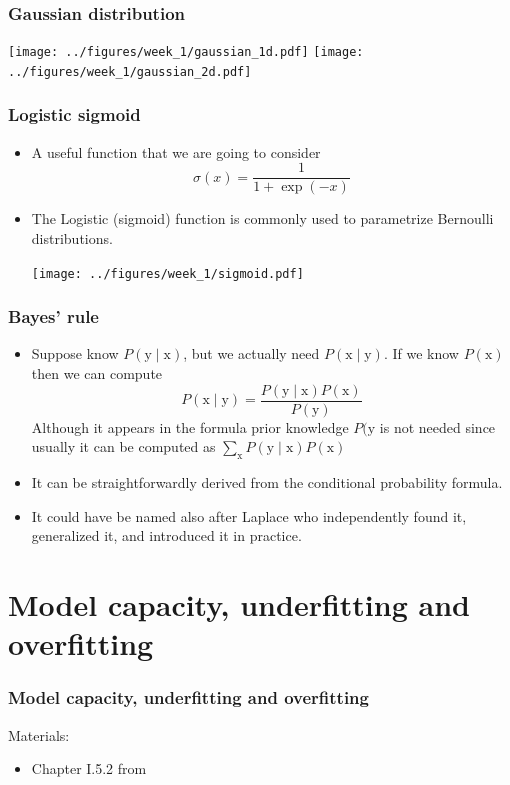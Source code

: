 \documentclass[notes]{beamer}          %
\begin{document}
\begin{frame}
\frametitle{Gaussian distribution}
\begin{center}
\texttt{[image: ../figures/week\_1/gaussian\_1d.pdf]}
\hfill
\texttt{[image: ../figures/week\_1/gaussian\_2d.pdf]}
\end{center}
\end{frame}

\begin{frame}
\frametitle{Logistic sigmoid}
\begin{itemize}
    \item A useful function that we are going to consider
    $$\sigma(x) = \frac{1}{1 + \exp{(-x)}}$$
    \item The Logistic (sigmoid) function is commonly used to parametrize Bernoulli distributions.
    \begin{center}
    \texttt{[image: ../figures/week\_1/sigmoid.pdf]}
    \end{center}

\end{itemize}
\end{frame}


\begin{frame}
\frametitle{Bayes' rule}
\begin{itemize}
    \item Suppose know $P(\text{y} \mid \text{x})$, but we actually need $P(\text{x} \mid \text{y})$. If we know $P(\text{x})$ then we can compute
    $$
        P(\text{x} \mid \text{y}) = \frac{P(\text{y} \mid \text{x})P(\text{x})}{P(\text{y})}
    $$
    Although it appears in the formula prior knowledge $P(\text{y}$ is not needed since usually it can be computed as $\sum_{\text{x}} P(\text{y} \mid \text{x})P(\text{x})$
    \item It can be straightforwardly derived from the conditional probability formula.
    \item It could have be named also after Laplace who independently found it, generalized it, and introduced it in practice.
\end{itemize}
\end{frame}

\fi %


\section{Model capacity, underfitting and overfitting}

\begin{frame}
\frametitle{Model capacity, underfitting and overfitting}
Materials:
\begin{itemize}
    \item Chapter I.5.2 from \cite{deeplearning}
\end{itemize}
\end{frame}
\end{document}
